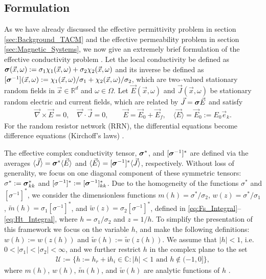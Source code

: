 \documentclass[english,12pt]{ttuthes}
\newcommand{\I}{\mathrm{i}}
\newcommand\bsig{\mbox{\boldmath${\sigma}$}}
\begin{document}
\subsection{Formulation} \label{sec:Crit_Theory_Formulation} 
%
As we have already discussed the effective permittivity problem in
section \ref{sec:Background_TACM} and the effective permeability
problem in section \ref{sec:Magnetic_Systems}, we now give an extremely
brief formulation of the effective conductivity problem
\cite{Golden:JMP-5627,Golden:CMP-473,Golden:PRL-3935}. Let the local
conductivity be defined
as $\bsig(\vec{x},\omega):=\sigma_1\chi_1(\vec{x},\omega)+\sigma_2\chi_2(\vec{x},\omega)$ 
and its inverse be defined as
$[\bsig^{-1}](\vec{x},\omega):=\chi_1(\vec{x},\omega)/\sigma_1+\chi_2(\vec{x},\omega)/\sigma_2$,
which are two--valued stationary random fields in
$\vec{x}\in\mathbb{R}^d$ and $\omega\in\Omega$. Let $\vec{E}(\vec{x},\omega)$ and
$\vec{J}(\vec{x},\omega)$ be stationary random electric and current fields,
which are related by $\vec{J}=\bsig\vec{E}$ and satisfy 
%
\begin{align}\label{eq:Maxwells_Equations_EJ}  
  	\vec{\nabla}\times\vec{E}=0, \quad
	\vec{\nabla}\cdot\vec{J}=0,\qquad 	
	\vec{E}=\vec{E}_0+\vec{E}_f, \quad
	\langle\vec{E}\rangle=\vec{E}_0:=E_0\vec{e}_k.
\end{align}
%
For the random resistor network (RRN), the differential equations
become difference equations (Kirchoff's laws)
\cite{Golden:CMP-467,Golden:JMP-5627}.

The effective complex conductivity tensor, $\bsig^*$, and 
$[\bsig^{-1}]^*$ are defined via the averages
$\langle\vec{J}\rangle=\bsig^*\langle\vec{E}\rangle$ and $\langle\vec{E}\rangle=[\bsig^{-1}]^*\langle\vec{J}\rangle$,
respectively. Without loss of  
generality, we focus on one diagonal component of these
symmetric tensors: $\sigma^*:=\bsig^*_{kk}$ and
$[\sigma^{-1}]^*:=[\bsig^{-1}]^*_{kk}$. Due to the homogeneity of the
functions $\sigma^*$ and $[\sigma^{-1}]^*$, we consider the dimensionless functions
$m(h)=\sigma^*/\sigma_2$, $w(z)=\sigma^*/\sigma_1$, $\tilde{m}(h)=\sigma_1[\sigma^{-1}]^*$, and
$\tilde{w}(z)=\sigma_2[\sigma^{-1}]^*$, defined in
\eqref{eq:Fs_Integral}--\eqref{eq:Ht_Integral}, where $h=\sigma_1/\sigma_2$ and
$z=1/h$. To simplify the presentation of this framework we focus on
the variable $h$, and make the following definitions: $w(h):=w(z(h))$
and $\tilde{w}(h):=\tilde{w}(z(h))$. We assume that $|h|<1$,
i.e. $0<|\sigma_1|<|\sigma_2|<\infty$, and we further restrict $h$ in the complex
plane to the set  
%
\begin{align}\label{eq:h_Domain}
  \mathcal{U}:=\{h:=h_r+\I h_i\in\mathbb{C}: |h|<1 \text{ and } h\not\in(-1,0]\},
\end{align}
%
where $m(h)$, $w(h)$, $\tilde{m}(h)$, and $\tilde{w}(h)$ are analytic
functions of $h$ \cite{Golden:CMP-473}.  
\end{document}
